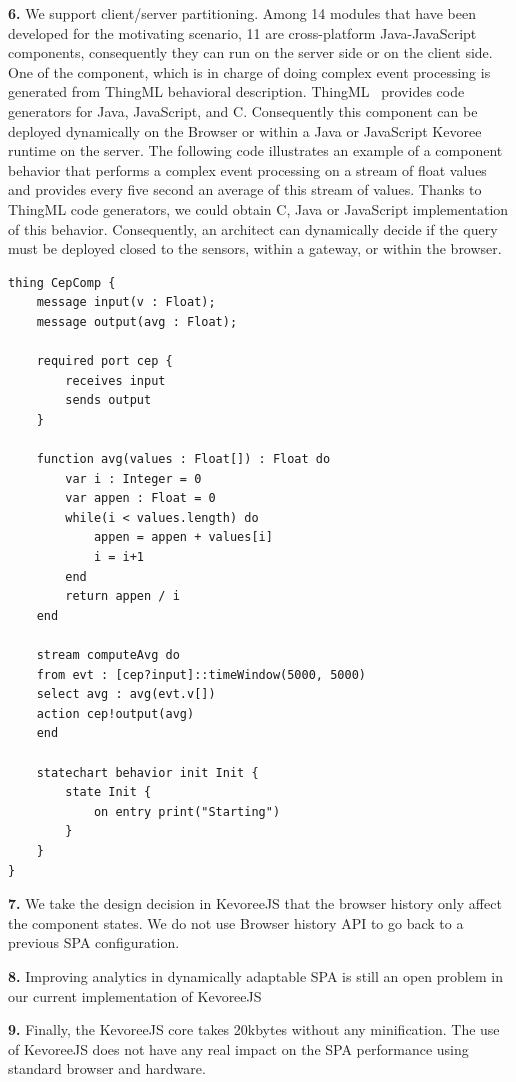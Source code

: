 \indent \textbf{6.} We support client/server partitioning. Among 14 modules that have been developed for the motivating scenario, 11 are cross-platform Java-JavaScript components, consequently they can run on the server side or on the client side.  One of the component, which is in charge of doing complex event processing is generated from ThingML behavioral description. ThingML~\cite{DBLP:conf/models/FleureyMSB11} provides code generators for Java, JavaScript, and C. Consequently this component can be deployed dynamically on the Browser or within a Java or JavaScript Kevoree runtime on the server.  The following code illustrates an example of a component behavior that performs a complex event processing on a stream of float values and provides every five second an average of this stream of values. Thanks to ThingML code generators, we could obtain C, Java or JavaScript implementation of this behavior. Consequently, an architect can dynamically decide if the query must be deployed closed to the sensors, within a gateway, or within the browser.

\begin{lstlisting}[language=ThingML,frame=none,caption={Excerpt of a component implementation defined using ThingML}]
thing CepComp {
	message input(v : Float);
	message output(avg : Float);

	required port cep {
		receives input
		sends output
	}

	function avg(values : Float[]) : Float do
		var i : Integer = 0
		var appen : Float = 0
		while(i < values.length) do
			appen = appen + values[i]
			i = i+1
		end
		return appen / i
	end

	stream computeAvg do
	from evt : [cep?input]::timeWindow(5000, 5000)
	select avg : avg(evt.v[])
	action cep!output(avg)
	end

	statechart behavior init Init {
		state Init {
			on entry print("Starting")
		}
	}
}
\end{lstlisting}



\indent \textbf{7.} We take the design decision in KevoreeJS that the browser history only affect the component states. We do not use Browser history API to go back to a previous SPA configuration.

\indent \textbf{8.} Improving analytics in dynamically adaptable SPA is still an open problem in our current implementation of KevoreeJS

\indent \textbf{9.} Finally, the KevoreeJS core takes 20kbytes without any minification. The use of KevoreeJS does not have any real impact on the SPA performance using standard browser and hardware.
